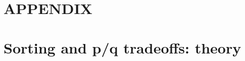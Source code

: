\documentclass[prodmode,acmec]{ec-acmsmall}
\begin{document}





\appendix 

\section*{APPENDIX}
\setcounter{section}{0}

\section{Sorting and p/q tradeoffs: theory} 
\label{sec:theory}
\end{document}
